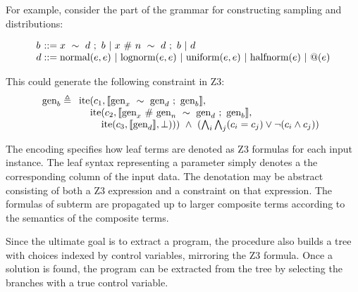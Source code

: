 \documentclass[runningheads]{llncs}
\begin{document}
For example, consider the part of the grammar for constructing sampling and distributions:

\[
  \begin{array}{l @{} l}
    b &{} ::= x\ \sim\ d\ ;\ b \ |\ x\ \#\ n\ \sim\ d\ ;\ b \ |\ d \\ 
    d &{} ::= 
        \text{normal}(e, e) \ |\ 
        \text{lognorm}(e, e) \ |\ 
        \text{uniform}(e, e) \ |\ 
        \text{halfnorm}(e) \ |\ 
        @(e) \\ 
  \end{array}
\]

This could generate the following constraint in Z3:
\[
  \text{gen}_b \triangleq
  \begin{array}[t]{l}
  \text{ite}(c_1, \llbracket \text{gen}_x\ \sim\ \text{gen}_d\ ;\ \text{gen}_b  \rrbracket, \\
    \hspace{4mm}\text{ite}(c_2, \llbracket \text{gen}_x\ \#\ \text{gen}_n\ \sim\ \text{gen}_d\ ;\ \text{gen}_b \rrbracket, \\
        \hspace{8mm}\text{ite}(c_3, \llbracket \text{gen}_d \rrbracket, \bot)))
  \ \wedge\ (\bigwedge\nolimits_i \bigwedge\nolimits_j (c_i = c_j) \vee \neg (c_i \wedge c_j) )
  \end{array}
\]


The encoding specifies how leaf terms are denoted as Z3 formulas for each input instance.
The leaf syntax representing a parameter simply denotes a the corresponding column of the input data. 
The denotation may be abstract consisting of both a Z3 expression and a constraint on that expression. 
The formulas of subterm are propagated up to larger composite terms according to the semantics of 
the composite terms.

Since the ultimate goal is to extract a program, the procedure also 
builds a tree with choices indexed by control variables, mirroring the Z3 formula.
Once a solution is found, the program can be extracted from the tree by selecting
the branches with a true control variable.
\end{document}
